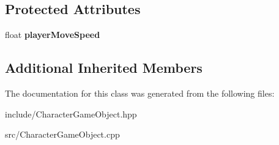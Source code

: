 \subsection*{Protected Attributes}
\begin{DoxyCompactItemize}
\item 
\hypertarget{class_character_game_object_a736ec33a6f85678d56a1885d24f6863d}{float {\bfseries player\-Move\-Speed}}\label{class_character_game_object_a736ec33a6f85678d56a1885d24f6863d}

\end{DoxyCompactItemize}
\subsection*{Additional Inherited Members}


The documentation for this class was generated from the following files\-:\begin{DoxyCompactItemize}
\item 
include/Character\-Game\-Object.\-hpp\item 
src/Character\-Game\-Object.\-cpp\end{DoxyCompactItemize}
